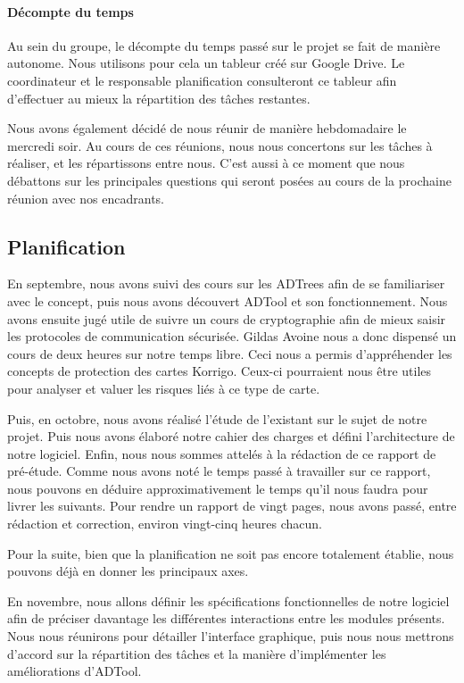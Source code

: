 	    \paragraph{Décompte du temps} Au sein du groupe, le décompte du temps passé sur le projet se fait de manière autonome. Nous utilisons pour cela un tableur créé sur Google Drive. Le coordinateur et le responsable planification consulteront ce tableur afin d'effectuer au mieux la répartition des tâches restantes.

	    Nous avons également décidé de nous réunir de manière hebdomadaire le mercredi soir. Au cours de ces réunions, nous nous concertons sur les tâches à réaliser, et les répartissons entre nous. C'est aussi à ce moment que nous débattons sur les principales questions qui seront posées au cours de la prochaine réunion avec nos encadrants.

	    
	\subsection{Planification}
		
		En septembre, nous avons suivi des cours sur les ADTrees afin de se familiariser avec le concept, puis nous avons découvert ADTool et son fonctionnement. Nous avons ensuite jugé utile de suivre un cours de cryptographie afin de mieux saisir les protocoles de communication sécurisée. Gildas {\sc Avoine} nous a donc dispensé un cours de deux heures sur notre temps libre. Ceci nous a permis d'appréhender les concepts de protection des cartes Korrigo. Ceux-ci pourraient nous être utiles pour analyser et valuer les risques liés à ce type de carte.
		
		Puis, en octobre, nous avons réalisé l'étude de l'existant sur le sujet de notre projet. Puis nous avons élaboré notre cahier des charges et défini l'architecture de notre logiciel. Enfin, nous nous sommes attelés à la rédaction de ce rapport de pré-étude. Comme nous avons noté le temps passé à travailler sur ce rapport, nous pouvons en déduire approximativement le temps qu'il nous faudra pour livrer les suivants. Pour rendre un rapport de vingt pages, nous avons passé, entre rédaction et correction, environ vingt-cinq heures chacun.
		
		Pour la suite, bien que la planification ne soit pas encore totalement établie, nous pouvons déjà en donner les principaux axes. 

		En novembre, nous allons définir les spécifications fonctionnelles de notre logiciel afin de préciser davantage les différentes interactions entre les modules présents. Nous nous réunirons pour détailler l'interface graphique, puis nous nous mettrons d'accord sur la répartition des tâches et la manière d'implémenter les améliorations d'ADTool.

